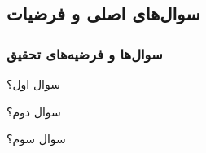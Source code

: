 \label{main_questions_and_study_hypothesis}

\subsection{سوال‌های اصلی و فرضیات}
\begin{frame}
\frametitle{سوال‌ها و فرضیه‌های تحقیق}

\begin{enumerate}\raggedleft
\begin{RTLitems}
\item سوال اول؟
\pause
\item سوال دوم؟
\pause
\item سوال سوم؟
\pause
\end{RTLitems}
\end{enumerate}


\end{frame}
